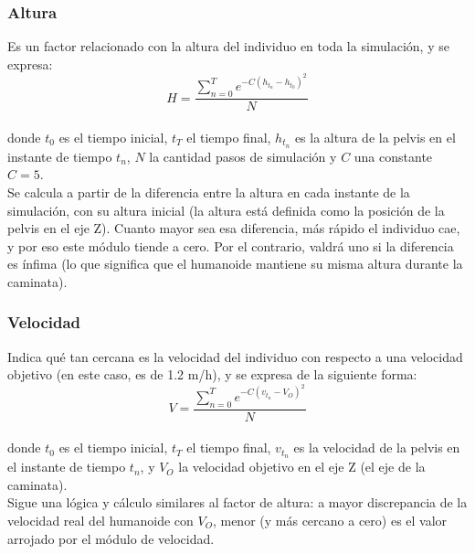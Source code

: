 \documentclass{article}
\begin{document}
\subsubsection{Altura}
\label{altura}
Es un factor relacionado con la altura del individuo en toda la simulaci\'on, y se expresa:\\
\begin{equation}
  H = \frac{\sum_{n=0}^{T} {e^{-C( h_{t_{n}} - h_{t_{0}} )^2  }}}{N}
\end{equation}
\\ donde $t_{0}$ es el tiempo inicial, $t_{T}$ el tiempo final, $h_{t_{n}}$ es la altura de la pelvis en el instante de tiempo $t_{n}$, $N$ la cantidad pasos de simulaci\'on y $C$ una constante $C=5$.
\\
Se calcula a partir de la diferencia entre la altura en cada instante de la simulaci\'on, con su altura inicial (la altura est\'a definida como la posici\'on de la pelvis en el eje Z). Cuanto mayor sea esa diferencia, m\'as r\'apido el individuo cae, y por eso este m\'odulo tiende a cero. Por el contrario, valdr\'a uno si la diferencia es \'infima (lo que significa que el humanoide mantiene su misma altura durante la caminata).


\subsubsection{Velocidad}
\label{velocidad}
Indica qu\'e tan cercana es la velocidad del individuo con respecto a una velocidad objetivo (en este caso, es de 1.2 m/h), y se expresa de la siguiente forma:\\
\begin{equation}
  V = \frac{\sum_{n=0}^{T} {e^{-C( v_{t_{n}} - V_{O} )^2  }}}{N}
\end{equation}
\\ donde $t_{0}$ es el tiempo inicial, $t_{T}$ el tiempo final, $v_{t_{n}}$ es la velocidad de la pelvis en el instante de tiempo $t_{n}$, y $V_{O}$ la velocidad objetivo en el eje Z (el eje de la caminata).
\\
Sigue una l\'ogica y c\'alculo similares al factor de altura: a mayor discrepancia de la velocidad real del humanoide con $V_{O}$, menor (y m\'as cercano a cero) es el valor arrojado por el m\'odulo de velocidad. 
\end{document}
